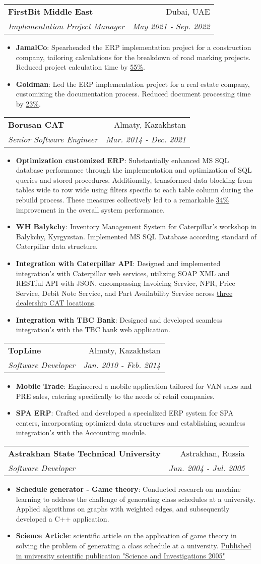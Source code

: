 \documentclass[letterpaper,11pt]{article}
\makeatletter
\newcommand{\resumeItem}[2]{
  \item\small{
    \textbf{#1}{: #2 \vspace{-2pt}}
  }
}
\newcommand{\resumeSubheading}[4]{
  \vspace{-1pt}\item
    \begin{tabular*}{0.97\textwidth}[t]{l@{\extracolsep{\fill}}r}
      \textbf{#1} & #2 \\
      \textit{\small#3} & \textit{\small #4} \\
    \end{tabular*}\vspace{-5pt}
}
\newcommand{\resumeItemListStart}{\begin{itemize}}
\newcommand{\resumeItemListEnd}{\end{itemize}\vspace{-5pt}}
\makeatother
\begin{document}
    \resumeSubheading{FirstBit Middle East}{Dubai, UAE}{Implementation Project Manager}{May 2021 - Sep. 2022}\resumeItemListStart\resumeItem{JamalCo}{Spearheaded the ERP implementation project for a construction company, tailoring calculations for the breakdown of road marking projects. Reduced project calculation time by \underline{55\%}.}\resumeItem{Goldman}{Led the ERP implementation project for a real estate company, customizing the documentation process. Reduced document processing time by \underline{23\%}.}\resumeItemListEnd
    
    \resumeSubheading{Borusan CAT}{Almaty, Kazakhstan}{Senior Software Engineer}{Mar. 2014 - Dec. 2021}
    \resumeItemListStart
    
        \resumeItem{Optimization customized ERP}{Substantially enhanced MS SQL database performance through the implementation and optimization of SQL queries and stored procedures. Additionally, transformed data blocking from tables wide to row wide using filters specific to each table column during the rebuild process. These measures collectively led to a remarkable \underline{34\%} improvement in the overall system performance.}
        \resumeItem{WH Balykchy}{Inventory Management System for Caterpillar's workshop in Balykchy, Kyrgyzstan. Implemented MS SQL Database according standard of Caterpillar data structure. }
        \resumeItem{Integration with Caterpillar API}{Designed and implemented integration's with Caterpillar web services, utilizing SOAP XML and RESTful API with JSON, encompassing Invoicing Service, NPR, Price Service, Debit Note Service, and Part Availability Service across \underline{three dealership CAT locations}.}
        \resumeItem{Integration with TBC Bank}{Designed and developed seamless integration's with the TBC bank web application.}
    \resumeItemListEnd

    \resumeSubheading{TopLine}{Almaty, Kazakhstan}{Software Developer}{Jan. 2010 - Feb. 2014}\resumeItemListStart\resumeItem{Mobile Trade}{Engineered a mobile application tailored for VAN sales and PRE sales, catering specifically to the needs of retail companies.}\resumeItem{SPA ERP}{Crafted and developed a specialized ERP system for SPA centers, incorporating optimized data structures and establishing seamless integration's with the Accounting module.}\resumeItemListEnd
      
    \resumeSubheading{Astrakhan State Technical University}{Astrakhan, Russia}{Software Developer}{Jun. 2004 - Jul. 2005}\resumeItemListStart\resumeItem{Schedule generator - Game theory}{Conducted research on machine learning to address the challenge of generating class schedules at a university. Applied algorithms on graphs with weighted edges, and subsequently developed a C++ application.}\resumeItem{Science Article}{scientific article on the application of game theory in solving the problem of generating a class schedule at a university. \underline{Published in university scientific publication "Science and Investigations 2005"}}\resumeItemListEnd
\end{document}
